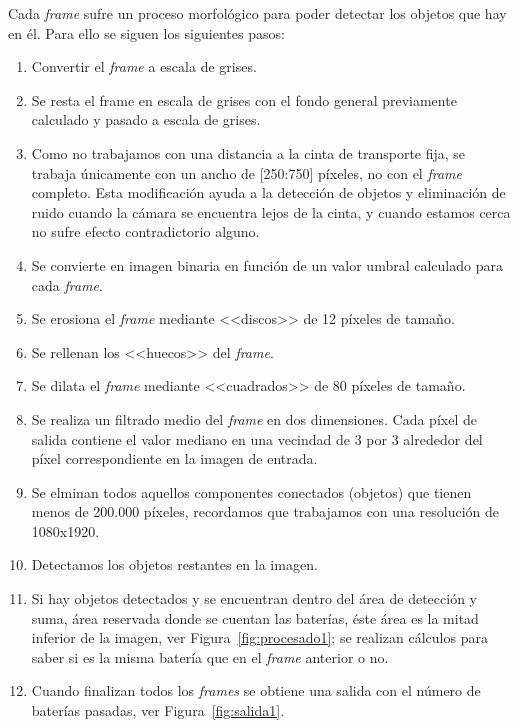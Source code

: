\documentclass[11pt]{memoir}
\begin{document}
Cada \textit{frame} sufre un proceso morfológico para poder detectar los objetos que hay en él. Para ello se siguen los siguientes pasos:
\begin{enumerate}
\item Convertir el \textit{frame} a escala de grises.
\item Se resta el frame en escala de grises con el fondo general previamente calculado y pasado a escala de grises.
\item Como no trabajamos con una distancia a la cinta de transporte fija, se trabaja únicamente con un ancho de [250:750] píxeles, no con el \textit{frame} completo. Esta modificación ayuda a la detección de objetos y eliminación de ruido cuando la cámara se encuentra lejos de la cinta, y cuando estamos cerca no sufre efecto contradictorio alguno.
\item Se convierte en imagen binaria en función de un valor umbral calculado para cada \textit{frame}.
\item Se erosiona el \textit{frame} mediante <<discos>> de 12 píxeles de tamaño.
\item Se rellenan los <<huecos>> del \textit{frame}.
\item Se dilata el \textit{frame} mediante <<cuadrados>> de 80 píxeles de tamaño.
\item Se realiza un filtrado medio del \textit{frame} en dos dimensiones. Cada píxel de salida contiene el valor mediano en una vecindad de 3 por 3 alrededor del píxel correspondiente en la imagen de entrada.
\item Se elminan todos aquellos componentes conectados (objetos) que tienen menos de 200.000 píxeles, recordamos que trabajamos con una resolución de 1080x1920.
\item Detectamos los objetos restantes en la imagen.
\item Si hay objetos detectados y se encuentran dentro del área de detección y suma, área reservada donde se cuentan las baterías, éste área es la mitad inferior de la imagen, ver Figura~\ref{fig:procesado1}; se realizan cálculos para saber si es la misma batería que en el \textit{frame} anterior o no.
\item Cuando finalizan todos los \textit{frames} se obtiene una salida con el número de baterías pasadas, ver Figura~\ref{fig:salida1}.
\end{enumerate} 
\end{document}
